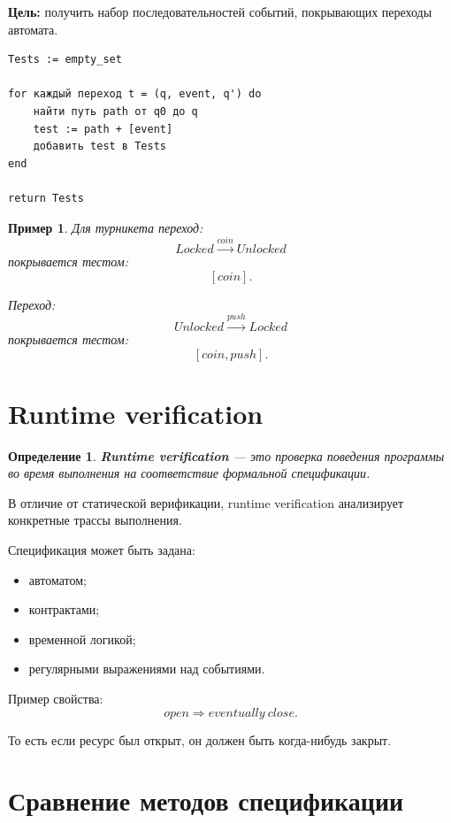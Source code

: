 \documentclass[12pt,a4paper]{article}
\newtheorem{definition}{Определение}
\newtheorem{example}{Пример}
\begin{document}
\textbf{Цель:}
получить набор последовательностей событий, покрывающих переходы автомата.

\begin{lstlisting}[style=pseudo]
Tests := empty_set

for каждый переход t = (q, event, q') do
    найти путь path от q0 до q
    test := path + [event]
    добавить test в Tests
end

return Tests
\end{lstlisting}

\begin{example}
Для турникета переход:
\[
    Locked \xrightarrow{coin} Unlocked
\]
покрывается тестом:
\[
    [coin].
\]

Переход:
\[
    Unlocked \xrightarrow{push} Locked
\]
покрывается тестом:
\[
    [coin, push].
\]
\end{example}

\section{Runtime verification}

\begin{definition}
\textbf{Runtime verification} --- это проверка поведения программы во время выполнения на соответствие формальной спецификации.
\end{definition}

В отличие от статической верификации, runtime verification анализирует конкретные трассы выполнения.

Спецификация может быть задана:
\begin{itemize}
    \item автоматом;
    \item контрактами;
    \item временной логикой;
    \item регулярными выражениями над событиями.
\end{itemize}

Пример свойства:
\[
    open \Rightarrow eventually\ close.
\]

То есть если ресурс был открыт, он должен быть когда-нибудь закрыт.

\section{Сравнение методов спецификации}
\end{document}
